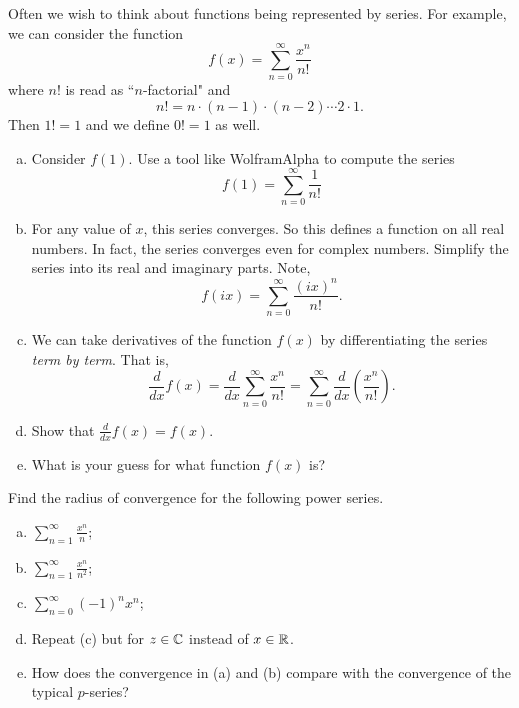 \documentclass[12pt]{article} %
\begin{document}
\begin{problem}
Often we wish to think about functions being represented by series.  For example, we can consider the function
\[
f(x)=\sum_{n=0}^\infty \frac{x^n}{n!}
\]
where $n!$ is read as ``$n$-factorial" and 
\[
n! = n\cdot (n-1)\cdot (n-2) \cdots 2 \cdot 1.
\]
Then $1!=1$ and we define $0!=1$ as well.
\begin{enumerate}[(a)]
    \item Consider $f(1)$.  Use a tool like WolframAlpha to compute the series
    \[
    f(1)=\sum_{n=0}^\infty \frac{1}{n!}
    \]
    \item For any value of $x$, this series converges. So this defines a function on all real numbers. In fact, the series converges even for complex numbers. Simplify the series into its real and imaginary parts. Note,
    \[
    f(ix) = \sum_{n=0}^\infty \frac{(ix)^n}{n!}.
    \]
    \item We can take derivatives of the function $f(x)$ by differentiating the series \emph{term by term}. That is,
    \[
    \frac{d}{dx} f(x) = \frac{d}{dx} \sum_{n=0}^\infty \frac{x^n}{n!} = \sum_{n=0}^\infty \frac{d}{dx} \left( \frac{ x^n}{n!}\right).
    \]
    \item Show that $\frac{d}{dx}f(x)=f(x)$.
    \item What is your guess for what function $f(x)$ is?
\end{enumerate}
\end{problem}

\begin{problem}
Find the radius of convergence for the following power series.
\begin{enumerate}[(a)]
    \item $\displaystyle{\sum_{n=1}^\infty \frac{x^n}{n}}$;
    \item $\displaystyle{\sum_{n=1}^\infty \frac{x^n}{n^2}}$;
    \item $\displaystyle{\sum_{n=0}^\infty (-1)^n x^n}$;
    \item Repeat (c) but for $z\in \mathbb{C}$ instead of $x\in \mathbb{R}$.
    \item How does the convergence in (a) and (b) compare with the convergence of the typical $p$-series?
\end{enumerate}
\end{problem}
\end{document}
